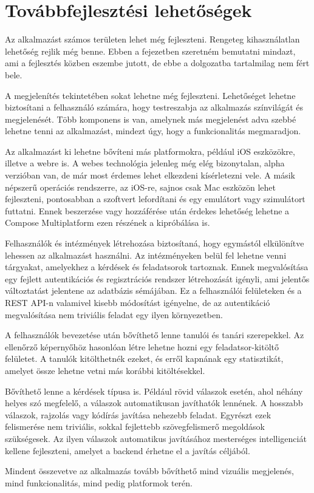 \chapter{Továbbfejlesztési lehetőségek}
\label{sec:Future}

Az alkalmazást számos területen lehet még fejleszteni.  
Rengeteg kihasználatlan lehetőség rejlik még benne.  
Ebben a fejezetben szeretném bemutatni mindazt, ami a fejlesztés közben eszembe jutott, de ebbe a dolgozatba tartalmilag nem fért bele.

A megjelenítés tekintetében sokat lehetne még fejleszteni.  
Lehetőséget lehetne biztosítani a felhasználó számára, hogy testreszabja az alkalmazás színvilágát és megjelenését.  
Több komponens is van, amelynek más megjelenést adva szebbé lehetne tenni az alkalmazást, mindezt úgy, hogy a funkcionalitás megmaradjon.

Az alkalmazást ki lehetne bővíteni más platformokra, például iOS eszközökre, illetve a webre is.  
A webes technológia jelenleg még elég bizonytalan, alpha verzióban van, de már most érdemes lehet elkezdeni kísérletezni vele.  
A másik népszerű operációs rendszerre, az iOS-re, sajnos csak Mac eszközön lehet fejleszteni, pontosabban a szoftvert lefordítani és egy emulátort vagy szimulátort futtatni.  
Ennek beszerzése vagy hozzáférése után érdekes lehetőség lehetne a Compose Multiplatform ezen részének a kipróbálása is.

Felhasználók és intézmények létrehozása biztosítaná, hogy egymástól elkülönítve lehessen az alkalmazást használni.  
Az intézményeken belül fel lehetne venni tárgyakat, amelyekhez a kérdések és feladatsorok tartoznak.  
Ennek megvalósítása egy fejlett autentikációs és regisztrációs rendszer létrehozását igényli, ami jelentős változtatást jelentene az adatbázis sémájában.  
Ez a felhasználói felületeken és a REST API-n valamivel kisebb módosítást igényelne, de az autentikáció megvalósítása nem triviális feladat egy ilyen környezetben.

A felhasználók bevezetése után bővíthető lenne tanulói és tanári szerepekkel.  
Az ellenőrző képernyőhöz hasonlóan létre lehetne hozni egy feladatsor-kitöltő felületet.  
A tanulók kitölthetnék ezeket, és erről kapnának egy statisztikát, amelyet össze lehetne vetni más korábbi kitöltésekkel.

Bővíthető lenne a kérdések típusa is.  
Például rövid válaszok esetén, ahol néhány helyes szó megfelelő, a válaszok automatikusan javíthatók lennének.  
A hosszabb válaszok, rajzolás vagy kódírás javítása nehezebb feladat.  
Egyrészt ezek felismerése nem triviális, sokkal fejlettebb szövegfelismerő megoldások szükségesek.  
Az ilyen válaszok automatikus javításához mesterséges intelligenciát kellene fejleszteni, amelyet a backend érhetne el a javítás céljából.

Mindent összevetve az alkalmazás tovább bővíthető mind vizuális megjelenés, mind funkcionalitás, mind pedig platformok terén.
